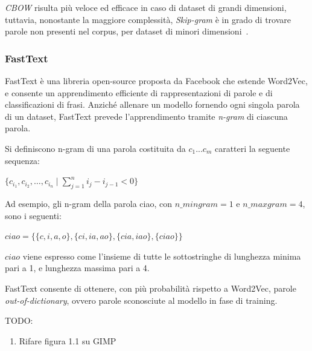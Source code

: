 \emph{CBOW} risulta più veloce ed efficace in caso di dataset di grandi dimensioni, tuttavia, nonostante la maggiore complessità, \emph{Skip-gram} è in grado di trovare parole non presenti nel corpus, per dataset di minori dimensioni~\cite{mikolov2013efficient}.


\subsubsection{FastText}

FastText è una libreria open-source proposta da Facebook che estende Word2Vec, e consente un apprendimento efficiente di rappresentazioni di parole e di classificazioni di frasi.
Anziché allenare un modello fornendo ogni singola parola di un dataset, FastText prevede l'apprendimento tramite \textit{n-gram} di ciascuna parola.

Si definiscono n-gram di una parola costituita da $c_1...c_m$ caratteri la seguente sequenza:
\begin{center}
$\{ c_{i_1}, c_{i_2}, \ldots, c_{i_n} \mid \sum\limits_{j=1}^n i_{j} - i_{j-1} < 0 \}$
\end{center}
Ad esempio, gli n-gram della parola ciao, con $n\_mingram = 1$ e $n\_maxgram = 4$, sono i seguenti:

\begin{center}
    $ciao = \{\{c, i, a, o\},\{ci, ia, ao\}, \{cia, iao\}, \{ciao\}\}$
\end{center}
$ciao$ viene espresso come l'insieme di tutte le sottostringhe di lunghezza minima pari a 1, e lunghezza massima pari a 4.



FastText consente di ottenere, con più probabilità rispetto a Word2Vec, parole \emph{out-of-dictionary}, ovvero parole sconosciute al modello in fase di training.

TODO:

\begin{enumerate}
    \item Rifare figura 1.1 su GIMP
\end{enumerate}
